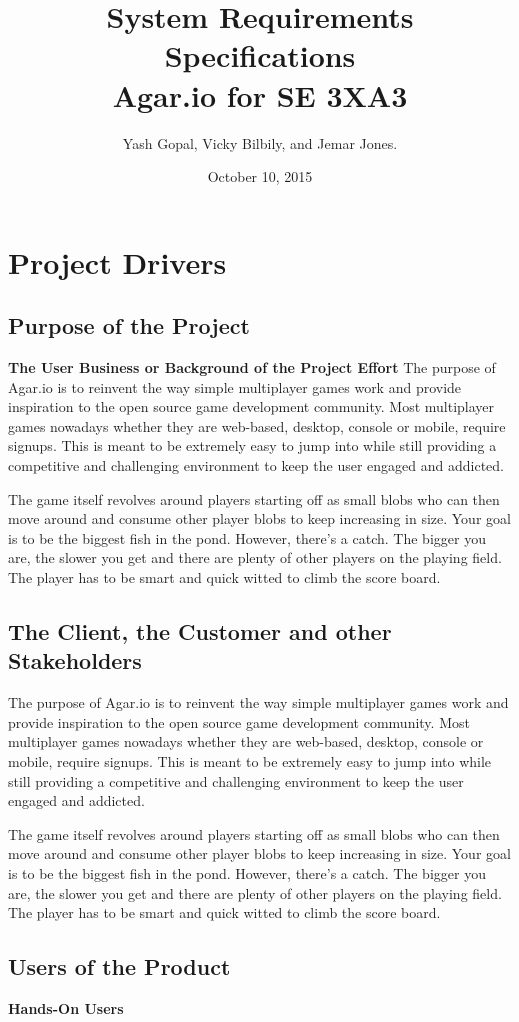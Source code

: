 \documentclass[12pt]{article}
\title{System Requirements Specifications\\
	\large Agar.io for SE 3XA3}
\author{Yash Gopal, Vicky Bilbily, and Jemar Jones.}
\date{October 10, 2015}
\begin{document}
\maketitle
\tableofcontents
\newpage

\section{Project Drivers}
\subsection{Purpose of the Project}
\textbf{The User Business or Background of the Project Effort}
The purpose of Agar.io is to reinvent the way simple multiplayer games work and provide inspiration to the open source game development community. Most multiplayer games nowadays whether they are web-based, desktop, console or mobile, require signups. This is meant to be extremely easy to jump into while still providing a competitive and challenging environment to keep the user engaged and addicted.

The game itself revolves around players starting off as small blobs who can then move around and consume other player blobs to keep increasing in size. Your goal is to be the biggest fish in the pond. However, there’s a catch. The bigger you are, the slower you get and there are plenty of other players on the playing field. The player has to be smart and quick witted to climb the score board.
\subsection{The Client, the Customer and other Stakeholders}
The purpose of Agar.io is to reinvent the way simple multiplayer games work and provide inspiration to the open source game development community. Most multiplayer games nowadays whether they are web-based, desktop, console or mobile, require signups. This is meant to be extremely easy to jump into while still providing a competitive and challenging environment to keep the user engaged and addicted.

The game itself revolves around players starting off as small blobs who can then move around and consume other player blobs to keep increasing in size. Your goal is to be the biggest fish in the pond. However, there’s a catch. The bigger you are, the slower you get and there are plenty of other players on the playing field. The player has to be smart and quick witted to climb the score board.
\subsection{Users of the Product}
\textbf{Hands-On Users}
\end{document}
